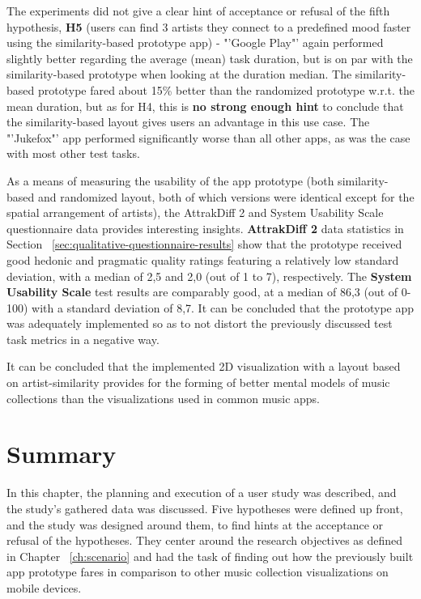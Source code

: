 The experiments did not give a clear hint of acceptance or refusal of the fifth hypothesis, \textbf{H5} (users can find 3 artists they connect to a predefined mood faster using the similarity-based prototype app) - "'Google Play"' again performed slightly better regarding the average (mean) task duration, but is on par with the similarity-based prototype when looking at the duration median. The similarity-based prototype fared about 15\% better than the randomized prototype w.r.t. the mean duration, but as for H4, this is \textbf{no strong enough hint} to conclude that the similarity-based layout gives users an advantage in this use case. The "'Jukefox"' app performed significantly worse than all other apps, as was the case with most other test tasks.

As a means of measuring the usability of the app prototype (both similarity-based and randomized layout, both of which versions were identical except for the spatial arrangement of artists), the AttrakDiff 2 and System Usability Scale questionnaire data provides interesting insights. \textbf{AttrakDiff 2} data statistics in Section ~\ref{sec:qualitative-questionnaire-results} show that the prototype received good hedonic and pragmatic quality ratings featuring a relatively low standard deviation, with a median of 2,5 and 2,0 (out of 1 to 7), respectively. The \textbf{System Usability Scale} test results are comparably good, at a median of 86,3 (out of 0-100) with a standard deviation of 8,7. It can be concluded that the prototype app was adequately implemented so as to not distort the previously discussed test task metrics in a negative way.

It can be concluded that the implemented 2D visualization with a layout based on artist-similarity provides for the forming of better mental models of music collections than the visualizations used in common music apps.

\section{Summary}

In this chapter, the planning and execution of a user study was described, and the study's gathered data was discussed. Five hypotheses were defined up front, and the study was designed around them, to find hints at the acceptance or refusal of the hypotheses. They center around the research objectives as defined in Chapter ~\ref{ch:scenario} and had the task of finding out how the previously built app prototype fares in comparison to other music collection visualizations on mobile devices. 

